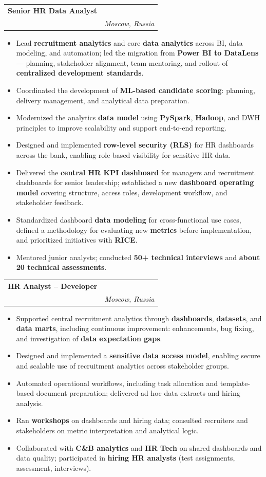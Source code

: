 \documentclass[letterpaper,10pt]{article}
\makeatletter
\newcommand{\resumeItem}[1]{
  \item\small{#1}
}
\newcommand{\resumeSubheading}[4]{
  \vspace{3pt}\item
    \begin{tabular*}{0.97\textwidth}[t]{l@{\extracolsep{\fill}}r}
      \textbf{#1} & \normalfont{#2} \\[1pt]
      \normalfont{#3} & \textit{#4} \\
    \end{tabular*}\vspace{0pt}
}
\newcommand{\resumeItemListStart}{\begin{itemize}}
\newcommand{\resumeItemListEnd}{\end{itemize}}
\makeatother
\begin{document}
    \resumeSubheading
        {Senior HR Data Analyst}{Nov 2023 -- Present}
        {Raiffeisen Bank Russia}{Moscow, Russia}
        \resumeItemListStart
            \resumeItem{Lead \textbf{recruitment analytics} and core \textbf{data analytics} across BI, data modeling, and automation; led the migration from \textbf{Power BI to DataLens} --- planning, stakeholder alignment, team mentoring, and rollout of \textbf{centralized development standards}.}
            \resumeItem{Coordinated the development of \textbf{ML-based candidate scoring}: planning, delivery management, and analytical data preparation.}
            \resumeItem{Modernized the analytics \textbf{data model} using \textbf{PySpark}, \textbf{Hadoop}, and DWH principles to improve scalability and support end-to-end reporting.}
            \resumeItem{Designed and implemented \textbf{row-level security (RLS)} for HR dashboards across the bank, enabling role-based visibility for sensitive HR data.}
            \resumeItem{Delivered the \textbf{central HR KPI dashboard} for managers and recruitment dashboards for senior leadership; established a new \textbf{dashboard operating model} covering structure, access roles, development workflow, and stakeholder feedback.}
            \resumeItem{Standardized dashboard \textbf{data modeling} for cross-functional use cases, defined a methodology for evaluating new \textbf{metrics} before implementation, and prioritized initiatives with \textbf{RICE}.}
            \resumeItem{Mentored junior analysts; conducted \textbf{50+ technical interviews} and \textbf{about 20 technical assessments}.}
        \resumeItemListEnd

    \resumeSubheading
        {HR Analyst -- Developer}{Sep 2021 -- Oct 2023}
        {Yandex --- Central Recruitment Analytics}{Moscow, Russia}
        \resumeItemListStart
            \resumeItem{Supported central recruitment analytics through \textbf{dashboards}, \textbf{datasets}, and \textbf{data marts}, including continuous improvement: enhancements, bug fixing, and investigation of \textbf{data expectation gaps}.}
            \resumeItem{Designed and implemented a \textbf{sensitive data access model}, enabling secure and scalable use of recruitment analytics across stakeholder groups.}
            \resumeItem{Automated operational workflows, including task allocation and template-based document preparation; delivered ad hoc data extracts and hiring analysis.}
            \resumeItem{Ran \textbf{workshops} on dashboards and hiring data; consulted recruiters and stakeholders on metric interpretation and analytical logic.}
            \resumeItem{Collaborated with \textbf{C\&B analytics} and \textbf{HR Tech} on shared dashboards and data quality; participated in \textbf{hiring HR analysts} (test assignments, assessment, interviews).}
        \resumeItemListEnd
\end{document}
